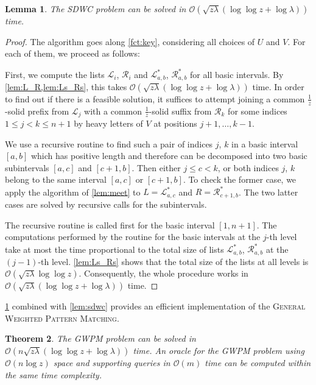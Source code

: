 \documentclass{article}
\theoremstyle{plain}
\newtheorem{theorem}{Theorem}[section]
\newtheorem{lemma}[theorem]{Lemma}
\theoremstyle{definition}
\newcommand{\GWPM}{\textsc{GWPM}\xspace}
\newcommand{\GWPMFull}{\textsc{General Weighted Pattern Matching}\xspace}
\newcommand{\SDWC}{\textsc{SDWC}\xspace}
\newcommand{\Oh}{\mathcal{O}}
\renewcommand{\L}{\mathcal{L}}
\newcommand{\R}{\mathcal{R}}
\newcommand{\Ls}{\mathcal{L}^*}
\newcommand{\Rs}{\mathcal{R}^*}
\newcommand{\fr}{\ensuremath{\frac1z}}
\newcommand{\mayqed}{}
\begin{document}
      \begin{lemma}\label{lem:DWM_hard}
        The \SDWC problem can be solved in $\Oh(\sqrt{z\lambda} (\log \log z + \log \lambda))$ time.
      \end{lemma}
      \begin{proof}
        The algorithm goes along \cref{fct:key}, considering all choices of $U$ and $V$.
        For each of them, we proceed as follows:
        
        First, we compute the lists $\L_i$, $\R_i$ and $\Ls_{a,b}$, $\Rs_{a,b}$ for all basic intervals.
        By \cref{lem:L_R,lem:Ls_Rs}, this takes $\Oh(\sqrt{z\lambda} (\log\log z+\log \lambda))$ time.
        In order to find out if there is a feasible solution, it suffices to attempt joining
        a common \fr-solid prefix from $\L_j$ with a common \fr-solid suffix from $\R_k$ for some indices $1 \le j < k \le n+1$
        by heavy letters of $V$ at positions $j+1,\ldots,k-1$.

        We use a recursive routine to find such a pair of indices $j$, $k$ in a basic interval $[a,b]$
        which has positive length and therefore can be decomposed into two basic subintervals $[a,c]$ and $[c+1,b]$.
        Then either $j \le c < k$, or both indices $j$, $k$ belong to the same interval $[a,c]$ or $[c+1,b]$.
        To check the former case, we apply the algorithm of \cref{lem:meet} to $L = \Ls_{a,c}$ and $R = \Rs_{c+1,b}$.
        The two latter cases are solved by recursive calls for the subintervals.

        The recursive routine is called first for the basic interval $[1,n+1]$.
        The computations performed by the routine for the basic intervals at the $j$-th level
        take at most the time proportional to the total size of lists $\Ls_{a,b}$, $\Rs_{a,b}$ at the $(j-1)$-th level.
        \cref{lem:Ls_Rs} shows that the total size of the lists at all levels is $\Oh(\sqrt{z\lambda} \log\log z)$.
        Consequently, the whole procedure works in $\Oh(\sqrt{z\lambda} (\log\log z+\log \lambda))$ time.
      \mayqed\end{proof}
      \cref{lem:DWM_hard} combined with \cref{lem:sdwc} provides an efficient implementation of the \GWPMFull.

    \begin{theorem}\label{lem:gwpm}
    The \GWPM problem can be solved in $\Oh(n\sqrt{z\lambda}(\log \log z + \log \lambda))$ time.
     An oracle for the \GWPM problem using $\Oh(n \log z)$ space and supporting queries in $\Oh(m)$ time can be
        computed within the same time complexity.
    \end{theorem}
\end{document}

